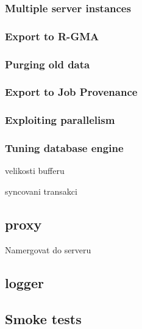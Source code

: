 \subsubsection{Multiple server instances}

\subsubsection{Export to R-GMA}

\subsubsection{Purging old data}


\subsubsection{Export to Job Provenance}


\subsubsection{Exploiting parallelism}

\subsubsection{Tuning database engine}


velikosti bufferu

syncovani transakci


\subsection{\LB proxy}

Namergovat do serveru

\subsection{\LB logger}


\subsection{Smoke tests}

